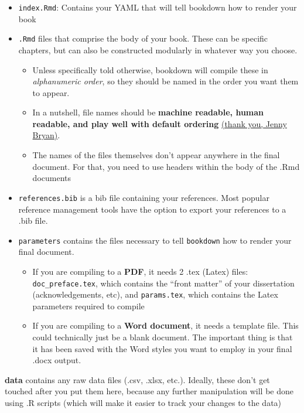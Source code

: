 \documentclass[
  12pt,
  oneside]{book}
\providecommand{\tightlist}{%
  \setlength{\itemsep}{0pt}\setlength{\parskip}{0pt}}
\numberwithin{figure}{chapter}
\begin{document}
\begin{itemize}
\item
  \texttt{index.Rmd}: Contains your YAML that will tell bookdown how to render your book
\item
  \texttt{.Rmd} files that comprise the body of your book. These can be specific chapters, but can also be constructed modularly in whatever way you choose.

  \begin{itemize}
  \tightlist
  \item
    Unless specifically told otherwise, bookdown will compile these in \emph{alphanumeric order}, so they should be named in the order you want them to appear.
  \item
    In a nutshell, file names should be \textbf{machine readable, human readable, and play well with default ordering} \href{https://speakerdeck.com/jennybc/how-to-name-files}{(thank you, Jenny Bryan)}.
  \item
    The names of the files themselves don't appear anywhere in the final document. For that, you need to use headers within the body of the .Rmd documents
  \end{itemize}
\item
  \texttt{references.bib} is a bib file containing your references. Most popular reference management tools have the option to export your references to a .bib file.
\item
  \texttt{parameters} contains the files necessary to tell \texttt{bookdown} how to render your final document.

  \begin{itemize}
  \tightlist
  \item
    If you are compiling to a \textbf{PDF}, it needs 2 .tex (Latex) files: \texttt{doc\_preface.tex}, which contains the ``front matter'' of your dissertation (acknowledgements, etc), and \texttt{params.tex}, which contains the Latex parameters required to compile
  \item
    If you are compiling to a \textbf{Word document}, it needs a template file. This could technically just be a blank document. The important thing is that it has been saved with the Word styles you want to employ in your final .docx output.
  \end{itemize}
\end{itemize}

\textbf{data} contains any raw data files (.csv, .xlsx, etc.). Ideally, these don't get touched after you put them here, because any further manipulation will be done using .R scripts (which will make it easier to track your changes to the data)
\end{document}
